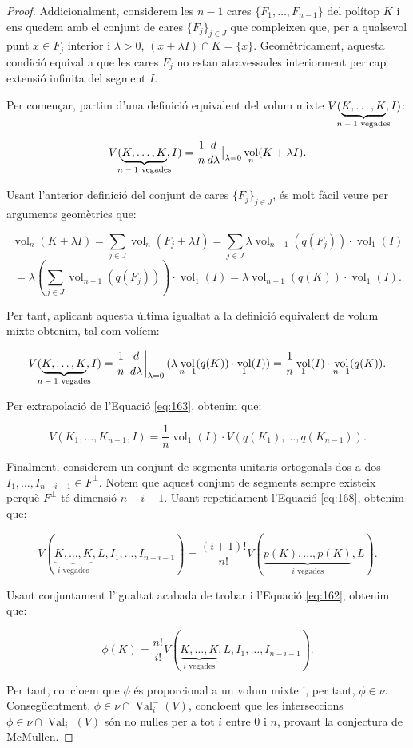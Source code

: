 \documentclass{article}
\theoremstyle{definition}
\DeclareMathOperator{\Val}{Val}
\DeclareMathOperator{\vol}{vol}
\begin{document}
\begin{proof}
Addicionalment, considerem les $n-1$ cares $\{ F_1, \dots, F_{n-1}\}$ del pol\'{i}top $K$ i ens quedem amb el conjunt de cares $\{F_j\}_{j \in J}$ que compleixen que, per a qualsevol punt $x \in F_j$ interior i $\lambda > 0$, $(x + \lambda I) \cap K = \{x\}$. Geom\`{e}tricament, aquesta condici\'{o} equival a que les cares $F_j$ no estan atravessades interiorment per cap extensi\'{o} infinita del segment $I$.

Per comen\c{c}ar, partim d'una definici\'{o} equivalent del volum mixte $V(\underbrace{K, \dots, K}_{\mathclap{\text{$n-1$ vegades}}}, I)$:

\[ V(\underbrace{K, \dots, K}_{\mathclap{\text{$n-1$ vegades}}}, I) = \frac{1}{n} \frac{d}{d\lambda} \big|_{\lambda=0} \vol_n(K + \lambda I).\]

Usant l'anterior definici\'{o} del conjunt de cares $\{ F_j \}_{j \in J}$, \'{e}s molt f\`{a}cil veure per arguments geom\`{e}trics que:

\[\vol_n (K + \lambda I) = \sum_{j \in J} \vol_{n} (F_j + \lambda I)  = \sum_{j \in J} \lambda \vol_{n-1}(q(F_j)) \cdot \vol_1(I)\]
\[= \lambda \left( \sum_{j \in J} \vol_{n-1}(q(F_j)) \right) \cdot \vol_1(I) =  \lambda \vol_{n-1}(q(K)) \cdot \vol_1(I).\]

Per tant, aplicant aquesta \'{u}ltima igualtat a la definici\'{o} equivalent de volum mixte obtenim, tal com vol\'{i}em:

\[ V(\underbrace{K, \dots, K}_{\mathclap{\text{$n-1$ vegades}}}, I) = \frac{1}{n} \left. \frac{d}{d\lambda} \right|_{\lambda=0} ( \lambda \vol_{n-1}(q(K)) \cdot \vol_1(I) ) = \frac{1}{n} \vol_1 (I) \cdot \vol_{n-1} (q(K)).\]

Per extrapolaci\'{o} de l'Equaci\'{o} \eqref{eq:163}, obtenim que:

\begin{equation} \label{eq:168}
    V(K_1, \dots, K_{n-1}, I) = \frac{1}{n} \vol_1(I) \cdot V(q(K_1), \dots, q(K_{n-1})).
\end{equation}

Finalment, considerem un conjunt de segments unitaris ortogonals dos a dos $I_1, \dots, I_{n-i-1} \in F^{\perp}$. Notem que aquest conjunt de segments sempre existeix perqu\`{e} $F^{\perp}$ t\'{e} dimensi\'{o} $n-i-1$. Usant repetidament l'Equaci\'{o} \eqref{eq:168}, obtenim que:

\[ V(\underbrace{K, \dots, K}_{\text{$i$ vegades}}, L, I_1, \dots, I_{n-i-1}) = \frac{(i+1)!}{n!} V(\underbrace{p(K), \dots, p(K)}_{\text{$i$ vegades}}, L).\]

Usant conjuntament l'igualtat acabada de trobar i l'Equaci\'{o} \eqref{eq:162}, obtenim que:

\[\phi(K) = \frac{n!}{i!} V(\underbrace{K, \dots, K}_{\text{$i$ vegades}}, L, I_1, \dots, I_{n-i-1}). \]

Per tant, concloem que $\phi$ \'{e}s proporcional a un volum mixte i, per tant, $\phi \in \nu$. Conseg\"{u}entment, $\phi \in \nu \cap \Val_i^-(V)$, concloent que les interseccions $\phi \in \nu \cap \Val_i^-(V)$ s\'{o}n no nul\textperiodcentered les per a tot $i$ entre $0$ i $n$, provant la conjectura de McMullen.

\end{proof}

\nocite{*}



\end{document}
